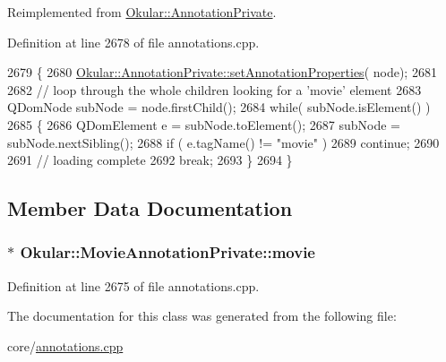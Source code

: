 Reimplemented from \hyperlink{classOkular_1_1AnnotationPrivate_a5fc7b450fa8c7e2717372e7394c3aa39}{Okular\+::\+Annotation\+Private}.



Definition at line 2678 of file annotations.\+cpp.


\begin{DoxyCode}
2679 \{
2680     \hyperlink{classOkular_1_1AnnotationPrivate_a5fc7b450fa8c7e2717372e7394c3aa39}{Okular::AnnotationPrivate::setAnnotationProperties}(
      node);
2681 
2682     \textcolor{comment}{// loop through the whole children looking for a 'movie' element}
2683     QDomNode subNode = node.firstChild();
2684     \textcolor{keywordflow}{while}( subNode.isElement() )
2685     \{
2686         QDomElement e = subNode.toElement();
2687         subNode = subNode.nextSibling();
2688         \textcolor{keywordflow}{if} ( e.tagName() != \textcolor{stringliteral}{"movie"} )
2689             \textcolor{keywordflow}{continue};
2690 
2691         \textcolor{comment}{// loading complete}
2692         \textcolor{keywordflow}{break};
2693     \}
2694 \}
\end{DoxyCode}


\subsection{Member Data Documentation}
\hypertarget{classOkular_1_1MovieAnnotationPrivate_a8c934fce0e6ec6906f203c4b0b3c153d}{
\subsubsection[{movie}]{$\ast$ Okular\+::\+Movie\+Annotation\+Private\+::movie}}\label{classOkular_1_1MovieAnnotationPrivate_a8c934fce0e6ec6906f203c4b0b3c153d}


Definition at line 2675 of file annotations.\+cpp.



The documentation for this class was generated from the following file\+:\begin{DoxyCompactItemize}
\item 
core/\hyperlink{annotations_8cpp}{annotations.\+cpp}\end{DoxyCompactItemize}
